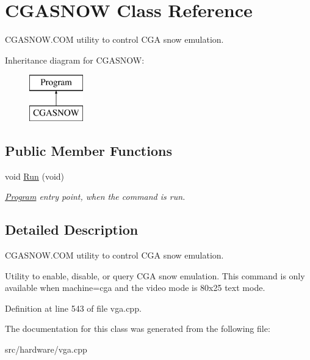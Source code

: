\hypertarget{classCGASNOW}{\section{C\-G\-A\-S\-N\-O\-W Class Reference}
\label{classCGASNOW}
}


C\-G\-A\-S\-N\-O\-W.\-C\-O\-M utility to control C\-G\-A snow emulation.  


Inheritance diagram for C\-G\-A\-S\-N\-O\-W\-:\begin{figure}[H]
\begin{center}
\leavevmode
\includegraphics[height=2.000000cm]{classCGASNOW}
\end{center}
\end{figure}
\subsection*{Public Member Functions}
\begin{DoxyCompactItemize}
\item 
\hypertarget{classCGASNOW_a756619df2231c00d48df4bfec4a8965b}{void \hyperlink{classCGASNOW_a756619df2231c00d48df4bfec4a8965b}{Run} (void)}\label{classCGASNOW_a756619df2231c00d48df4bfec4a8965b}

\begin{DoxyCompactList}\small\item\em \hyperlink{classProgram}{Program} entry point, when the command is run. \end{DoxyCompactList}\end{DoxyCompactItemize}


\subsection{Detailed Description}
C\-G\-A\-S\-N\-O\-W.\-C\-O\-M utility to control C\-G\-A snow emulation. 

Utility to enable, disable, or query C\-G\-A snow emulation. This command is only available when machine=cga and the video mode is 80x25 text mode. 

Definition at line 543 of file vga.\-cpp.



The documentation for this class was generated from the following file\-:\begin{DoxyCompactItemize}
\item 
src/hardware/vga.\-cpp\end{DoxyCompactItemize}
